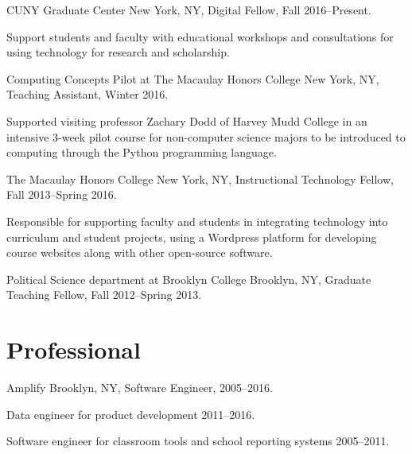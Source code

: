 \documentclass[letterpaper]{article}
\renewenvironment{itemize}{
  \begin{list}{}{
    \setlength{\leftmargin}{1.5em}
  }
}{
  \end{list}
}
\begin{document}
\begin{itemize}
    \item CUNY Graduate Center New York, NY, Digital Fellow, Fall 2016--Present.
      \begin{itemize}
        \item Support students and faculty with educational workshops and consultations for using technology for research and scholarship.
      \end{itemize}
    \item Computing Concepts Pilot at The Macaulay Honors College New York, NY, Teaching Assistant, Winter 2016.
      \begin{itemize}
        \item Supported visiting professor Zachary Dodd of Harvey Mudd College in an intensive 3-week pilot course for non-computer science majors to be introduced to computing through the Python programming language.
      \end{itemize}
    \item The Macaulay Honors College New York, NY, Instructional Technology Fellow, Fall 2013--Spring 2016.
      \begin{itemize}
        \item Responsible for supporting faculty and students in integrating technology into curriculum and student projects, using a Wordpress platform for developing course websites along with other open-source software.
      \end{itemize}
    \item Political Science department at Brooklyn College Brooklyn, NY, Graduate Teaching Fellow, Fall 2012--Spring 2013.
\end{itemize}

\section*{Professional}

\begin{itemize}
    \item Amplify Brooklyn, NY, Software Engineer, 2005--2016.
        \begin{itemize}
            \item Data engineer for product development 2011--2016.
            \item Software engineer for classroom tools and school reporting systems 2005--2011.
        \end{itemize}
\end{itemize}
\end{document}
